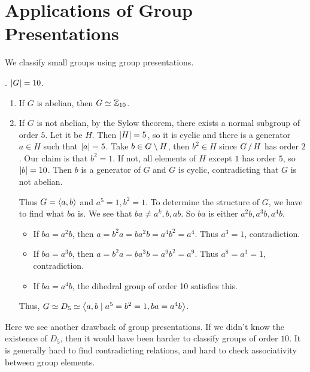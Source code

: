 \section*{Applications of Group Presentations}

We classify small groups using group presentations.

\ex. \(\left| G \right| = 10\).
\begin{enumerate}
    \item If \(G\) is abelian, then \(G \simeq \mathbb{Z}_{10}\).
    \item If \(G\) is not abelian, by the Sylow theorem, there exists a normal subgroup of order \(5\). Let it be \(H\). Then \(\left| H \right| = 5\), so it is cyclic and there is a generator \(a \in H\) such that \(\left| a \right| = 5\). Take \(b \in G \setminus H\), then \(b^2 \in H\) since \(G \operatorname{/} H\) has order \(2\). Our claim is that \(b^2 = 1\). If not, all elements of \(H\) except \(1\) has order \(5\), so \(\left| b \right| = 10\). Then \(b\) is a generator of \(G\) and \(G\) is cyclic, contradicting that \(G\) is not abelian.

          Thus \(G = \left\langle a, b \right\rangle\) and \(a^5 = 1, b^2 = 1\). To determine the structure of \(G\), we have to find what \(ba\) is. We see that \(ba \neq a^k, b, ab\). So \(ba\) is either \(a^2b, a^3b, a^4b\).

          \begin{itemize}
              \item If \(ba = a^2b\), then \(a = b^2a = ba^2b = a^4b^2 = a^4\). Thus \(a^3 = 1\), contradiction.
              \item If \(ba = a^3b\), then \(a = b^2a = ba^3b = a^9 b^2 = a^9\). Thus \(a^8 = a^3 = 1\), contradiction.
              \item If \(ba = a^4b\), the dihedral group of order 10 satisfies this.
          \end{itemize}
          Thus, \(G \simeq D_5 \simeq \left\langle a, b \mid a^5 = b^2 = 1, ba = a^4b \right\rangle\).
\end{enumerate}

Here we see another drawback of group presentations. If we didn't know the existence of \(D_5\), then it would have been harder to classify groups of order \(10\). It is generally hard to find contradicting relations, and hard to check associativity between group elements.

